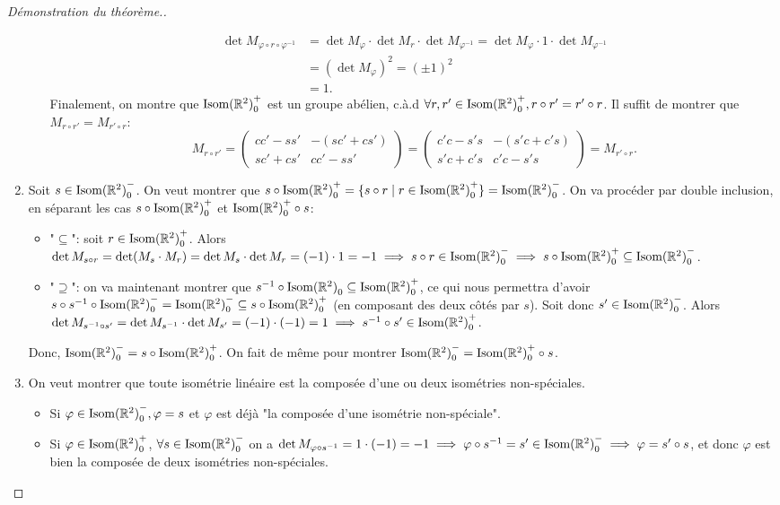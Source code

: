 \documentclass{book}
\numberwithin{equation}{section}
\renewcommand{\phi}{\varphi}
\providecommand{\plan}{{\mathbb R^2}}
\providecommand{\isom}{{\textnormal{Isom}(\plan)}}
\providecommand{\isomo}{{\isom_0}}
\providecommand{\isomop}{\isom_0^+}
\providecommand{\isomom}{\isom_0^-}
\providecommand{\st}{\mid}
\begin{document}
\begin{proof}[Démonstration du théorème.]
\begin{enumerate}
\begin{itemize}
			\begin{align*}
				\det M_{\phi \circ r \circ \phi^{-1}} &= \det M_\phi \cdot \det M_r \cdot \det M_{\phi^{-1}} = \det M_\phi \cdot 1 \cdot \det M_{\phi^{-1}}\\
				&= (\det M_\phi)^2 = (\pm 1)^2\\
				&= 1.
			\end{align*}
			Finalement, on montre que $\isomop$ est un groupe abélien, c.à.d $\forall r, r' \in \isomop, r \circ r' = r' \circ r$. Il suffit de montrer que $M_{r \circ r'} = M_{r' \circ r}$:
			\begin{equation*}
				 M_{r \circ r'} = \begin{pmatrix}
				 	cc' - ss' & -(sc' + cs') \\
				 	sc' + cs' & cc' - ss'
				 \end{pmatrix} = \begin{pmatrix}
				 	c'c - s's & -(s'c + c's) \\
				 	s'c + c's & c'c - s's
				 \end{pmatrix}
				 = M_{r' \circ r}.
			\end{equation*}
		\end{itemize}
		
		\item Soit $s \in \isomom$. On veut montrer que $s \circ \isomop = \{s \circ r \st r \in \isomop \} = \isomom$. On va procéder par double inclusion, en séparant les cas $s \circ \isomop$ et $\isomop \circ s$:
		\begin{itemize}
			\item "$\subseteq$": soit $r \in \isomop$. Alors $\det M_{s \circ r} = \det (M_s \cdot M_r) = \det M_s \cdot \det M_r = (-1) \cdot 1 = -1 \implies s \circ r \in \isomom \implies s \circ \isomop \subseteq \isomom$.
			\item "$\supseteq$": on va maintenant montrer que $s^{-1} \circ \isomo \subseteq \isomop$, ce qui nous permettra d'avoir $s \circ s^{-1} \circ \isomom = \isomom \subseteq s \circ \isomop$ (en composant des deux côtés par $s$). Soit donc $s' \in \isomom$. Alors $\det M_{s^{-1} \circ s'} = \det M_{s^{-1}} \cdot \det M_{s'} = (-1) \cdot (-1) = 1 \implies s^{-1} \circ s' \in \isomop$.
		\end{itemize}
		Donc, $\isomom = s \circ \isomop$. On fait de même pour montrer $\isomom = \isomop \circ s$.
		
		\item On veut montrer que toute isométrie linéaire est la composée d'une ou deux isométries non-spéciales.
		\begin{itemize}
			\item Si $\phi \in \isomom, \phi = s$ et $\phi$ est déjà "la composée d'une isométrie non-spéciale".
			\item Si $\phi \in \isomop$, $\forall s \in \isomom$ on a $\det M_{\phi \circ s^{-1}} = 1 \cdot (-1) = -1 \implies \phi \circ s^{-1} = s' \in \isomom \implies \phi = s' \circ s$, et donc $\phi$ est bien la composée de deux isométries non-spéciales.
		\end{itemize}
	\end{enumerate}
\end{proof}
\end{document}
